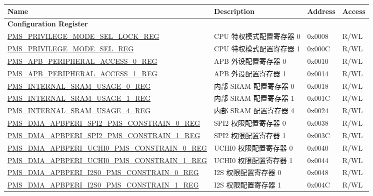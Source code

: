 
\begin{longtable}{ | p{9.5cm} | p{7.5cm} | p{2cm} | p{} | }
\hline\rowcolor{lightgray}
Name & Description &  Address & Access \\ \hline
\endhead
\multicolumn{4}{|l|}{\textbf{Configuration Register}} \\ \hline
\hyperref[regdesc:PMSPRIVILEGEMODESELLOCKREG]{PMS\_PRIVILEGE\_MODE\_SEL\_LOCK\_REG} & CPU 特权模式配置寄存器 0 & 0x0008 & R/WL \\ \hline
\hyperref[regdesc:PMSPRIVILEGEMODESELREG]{PMS\_PRIVILEGE\_MODE\_SEL\_REG} & CPU 特权模式配置寄存器 1 & 0x000C & R/WL \\ \hline
\hyperref[regdesc:PMSAPBPERIPHERALACCESS0REG]{PMS\_APB\_PERIPHERAL\_ACCESS\_0\_REG} & APB 外设配置寄存器 0 & 0x0010 & R/WL \\ \hline
\hyperref[regdesc:PMSAPBPERIPHERALACCESS1REG]{PMS\_APB\_PERIPHERAL\_ACCESS\_1\_REG} & APB 外设配置寄存器 1 & 0x0014 & R/WL \\ \hline
\hyperref[regdesc:PMSINTERNALSRAMUSAGE0REG]{PMS\_INTERNAL\_SRAM\_USAGE\_0\_REG} & 内部 SRAM 配置寄存器 0 & 0x0018 & R/WL \\ \hline
\hyperref[regdesc:PMSINTERNALSRAMUSAGE1REG]{PMS\_INTERNAL\_SRAM\_USAGE\_1\_REG} & 内部 SRAM 配置寄存器 1 & 0x001C & R/WL \\ \hline
\hyperref[regdesc:PMSINTERNALSRAMUSAGE4REG]{PMS\_INTERNAL\_SRAM\_USAGE\_4\_REG} & 内部 SRAM 配置寄存器 4 & 0x0024 & R/WL \\ \hline
\hyperref[regdesc:PMSDMAAPBPERISPI2PMSCONSTRAIN0REG]{PMS\_DMA\_APBPERI\_SPI2\_PMS\_CONSTRAIN\_0\_REG} & SPI2 权限配置寄存器 0 & 0x0038 & R/WL \\ \hline
\hyperref[regdesc:PMSDMAAPBPERISPI2PMSCONSTRAIN1REG]{PMS\_DMA\_APBPERI\_SPI2\_PMS\_CONSTRAIN\_1\_REG} & SPI2 权限配置寄存器 1 & 0x003C & R/WL \\ \hline
\hyperref[regdesc:PMSDMAAPBPERIUCHI0PMSCONSTRAIN0REG]{PMS\_DMA\_APBPERI\_UCHI0\_PMS\_CONSTRAIN\_0\_REG} & UCHI0 权限配置寄存器 0 & 0x0040 & R/WL \\ \hline
\hyperref[regdesc:PMSDMAAPBPERIUCHI0PMSCONSTRAIN1REG]{PMS\_DMA\_APBPERI\_UCHI0\_PMS\_CONSTRAIN\_1\_REG} & UCHI0 权限配置寄存器 1 & 0x0044 & R/WL \\ \hline
\hyperref[regdesc:PMSDMAAPBPERII2S0PMSCONSTRAIN0REG]{PMS\_DMA\_APBPERI\_I2S0\_PMS\_CONSTRAIN\_0\_REG} & I2S 权限配置寄存器 0 & 0x0048 & R/WL \\ \hline
\hyperref[regdesc:PMSDMAAPBPERII2S0PMSCONSTRAIN1REG]{PMS\_DMA\_APBPERI\_I2S0\_PMS\_CONSTRAIN\_1\_REG} & I2S 权限配置寄存器 1 & 0x004C & R/WL \\ \hline

\end{longtable}
